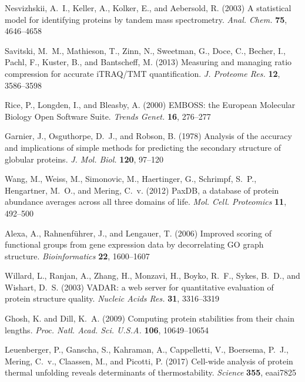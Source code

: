 \documentclass[11pt,letter]{article}\usepackage[]{graphicx}\usepackage[]{color}
\begin{document}
\begin{thebibliography}{}
Nesvizhskii, A.~I., Keller, A., Kolker, E., and Aebersold, R. (2003) A
  statistical model for identifying proteins by tandem mass spectrometry.
  {\emph{Anal. Chem.}} {\bf 75}, 4646--4658

Savitski, M.~M., Mathieson, T., Zinn, N., Sweetman, G., Doce, C., Becher, I.,
  Pachl, F., Kuster, B., and Bantscheff, M. (2013) Measuring and managing ratio
  compression for accurate {iTRAQ}/{TMT} quantification. {\emph{J. Proteome
  Res.}} {\bf 12}, 3586--3598

Rice, P., Longden, I., and Bleasby, A. (2000) {EMBOSS}: the {European}
  {Molecular} {Biology} {Open} {Software} {Suite}. {\emph{Trends Genet.}} {\bf
  16}, 276--277

Garnier, J., Osguthorpe, D.~J., and Robson, B. (1978) Analysis of the accuracy
  and implications of simple methods for predicting the secondary structure of
  globular proteins. {\emph{J. Mol. Biol.}} {\bf 120}, 97--120

Wang, M., Weiss, M., Simonovic, M., Haertinger, G., Schrimpf, S.~P.,
  Hengartner, M.~O., and Mering, C.~v. (2012) {PaxDB}, a database of protein
  abundance averages across all three domains of life. {\emph{Mol. Cell.
  Proteomics}} {\bf 11}, 492--500

Alexa, A., Rahnenführer, J., and Lengauer, T. (2006) Improved scoring of
  functional groups from gene expression data by decorrelating {GO} graph
  structure. {\emph{Bioinformatics}} {\bf 22}, 1600--1607

Willard, L., Ranjan, A., Zhang, H., Monzavi, H., Boyko, R.~F., Sykes, B.~D.,
  and Wishart, D.~S. (2003) {VADAR}: a web server for quantitative evaluation
  of protein structure quality. {\emph{Nucleic Acids Res.}} {\bf 31},
  3316--3319

Ghosh, K. and Dill, K.~A. (2009) Computing protein stabilities from their chain
  lengths. {\emph{Proc. Natl. Acad. Sci. U.S.A.}} {\bf 106}, 10649--10654

Leuenberger, P., Ganscha, S., Kahraman, A., Cappelletti, V., Boersema, P.~J.,
  Mering, C.~v., Claassen, M., and Picotti, P. (2017) Cell-wide analysis of
  protein thermal unfolding reveals determinants of thermostability.
  {\emph{Science}} {\bf 355}, eaai7825


\end{thebibliography}
\end{document}
